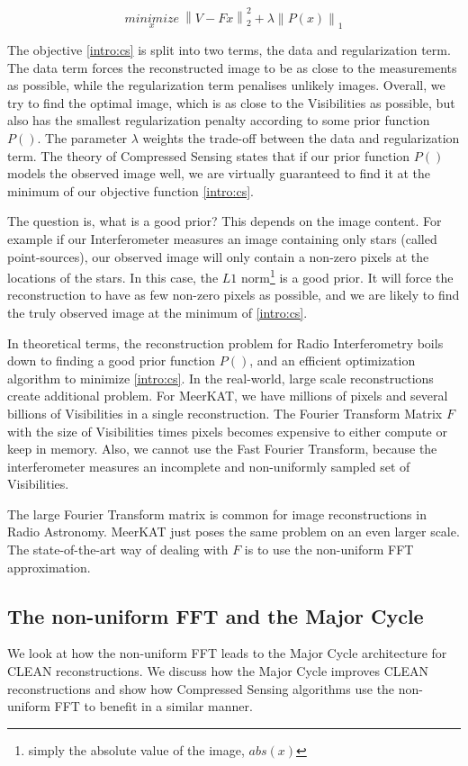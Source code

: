 \begin{equation}\label{intro:cs}
\underset{x}{minimize} \: \left \| V - Fx \right \|_2^2 + \lambda \left \| P(x) \right \|_1
\end{equation}

The objective \eqref{intro:cs} is split into two terms, the data and regularization term. The data term forces the reconstructed image to be as close to the measurements as possible, while the regularization term penalises unlikely images. Overall, we try to find the optimal image, which is as close to the Visibilities as possible, but also has the smallest regularization penalty according to some prior function $P()$. The parameter $\lambda$ weights the trade-off between the data and regularization term. The theory of Compressed Sensing states that if our prior function $P()$ models the observed image well, we are virtually guaranteed to find it at the minimum of our objective function \eqref{intro:cs}.

The question is, what is a good prior? This depends on the image content. For example if our Interferometer measures an image containing only stars (called point-sources), our observed image will only contain a non-zero pixels at the locations of the stars. In this case, the $L1$ norm\footnote{simply the absolute value of the image, $abs(x)$} is a good prior. It will force the reconstruction to have as few non-zero pixels as possible, and we are likely to find the truly observed image at the minimum of \eqref{intro:cs}.

In theoretical terms, the reconstruction problem for Radio Interferometry boils down to finding a good prior function $P()$, and an efficient optimization algorithm to minimize \eqref{intro:cs}. In the real-world, large scale reconstructions create additional problem. For MeerKAT, we have millions of pixels and several billions of Visibilities in a single reconstruction. The Fourier Transform Matrix $F$ with the size of Visibilities times pixels becomes expensive to either compute or keep in memory. Also, we cannot use the Fast Fourier Transform, because the interferometer measures an incomplete and non-uniformly sampled set of Visibilities.

The large Fourier Transform matrix is common for image reconstructions in Radio Astronomy. MeerKAT just poses the same problem on an even larger scale.
The state-of-the-art way of dealing with $F$ is to use the non-uniform FFT approximation.

\subsection{The non-uniform FFT and the Major Cycle}
We look at how the non-uniform FFT leads to the Major Cycle architecture for CLEAN reconstructions. We discuss how the Major Cycle improves CLEAN reconstructions and show how Compressed Sensing algorithms use the non-uniform FFT to benefit in a similar manner.

